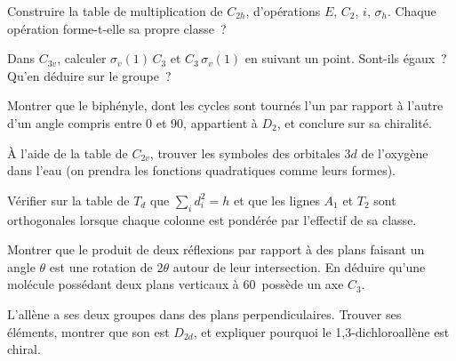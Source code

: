 \begin{exercise}[$\star\star$]\label{exo:b3:point-groups:5}
Construire la table de multiplication de $C_{2h}$, d'opérations $E$,
$C_2$, $i$,
$\sigma_h$. Chaque opération forme-t-elle sa propre classe~?
\end{exercise}

\begin{exercise}[$\star\star$]\label{exo:b3:point-groups:6}
Dans $C_{3v}$, calculer $\sigma_v(1)\,C_3$ et $C_3\,\sigma_v(1)$ en suivant
un point. Sont-ils égaux~? Qu'en déduire sur le groupe~?
\end{exercise}

\begin{exercise}[$\star\star$]\label{exo:b3:point-groups:7}
Montrer que le biphényle, dont les cycles sont tournés l'un par rapport à
l'autre d'un angle compris entre 0 et 90\textdegree, appartient à $D_2$, et
conclure sur sa chiralité.
\end{exercise}

\begin{exercise}[$\star\star$]\label{exo:b3:point-groups:8}
À l'aide de la table de $C_{2v}$, trouver les symboles des orbitales
$3d$ de l'oxygène dans l'eau (on prendra les fonctions quadratiques
comme leurs formes).
\end{exercise}

\begin{exercise}[$\star\star$]\label{exo:b3:point-groups:9}
Vérifier sur la table de $T_d$ que $\sum_id_i^2 = h$ et que les lignes
$A_1$ et $T_2$ sont orthogonales lorsque chaque colonne est pondérée par
l'effectif de sa classe.
\end{exercise}

\begin{exercise}[$\star\star\star$]\label{exo:b3:point-groups:10}
Montrer que le produit de deux réflexions par rapport à des plans faisant
un angle
$\theta$ est une rotation de $2\theta$ autour de leur intersection. En
déduire qu'une molécule possédant deux plans verticaux à 60\textdegree\
possède un axe $C_3$.
\end{exercise}

\begin{exercise}[$\star\star\star$]\label{exo:b3:point-groups:11}
L'allène \ce{H2C=C=CH2} a ses deux groupes \ce{CH2} dans des plans
perpendiculaires. Trouver ses éléments, montrer que son 
est $D_{2d}$, et expliquer pourquoi le 1,3-dichloroallène
 est chiral.
\end{exercise}

